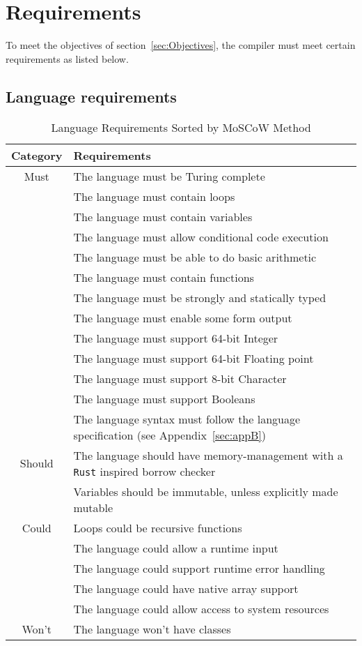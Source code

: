 \newpage
\section{Requirements}
\label{sec:Requirements}

To meet the objectives of section~\ref{sec:Objectives}, the compiler must meet
certain requirements as listed below.

\subsection{Language requirements} 

\begin{table}[ht]
\centering
\begin{tabular}{|c|l|}
\hline
\rowcolor{gray!50}
\textbf{Category} & \textbf{Requirements} \\
\hline
Must & The language must be Turing complete \\
     & The language must contain loops \\
     & The language must contain variables \\
     & The language must allow conditional code execution \\
     & The language must be able to do basic arithmetic \\
     & The language must contain functions \\
     & The language must be strongly and statically typed \\
     & The language must enable some form output\\
     & The language must support 64-bit Integer \\
     & The language must support 64-bit Floating point \\
     & The language must support 8-bit Character \\
     & The language must support Booleans \\
     & The language syntax must follow the language specification (see
     Appendix~\ref{sec:appB}) \\
\hline
Should & The language should have memory-management with a \texttt{Rust} inspired borrow checker \\
       & Variables should be immutable, unless explicitly made mutable \\
\hline
Could & Loops could be recursive functions \\
     & The language could allow a runtime input \\
     & The language could support runtime error handling \\
     & The language could have native array support \\
     & The language could allow access to system resources \\
\hline
Won't & The language won't have classes \\
\hline
\end{tabular}
\caption{Language Requirements Sorted by MoSCoW Method}
\end{table}

